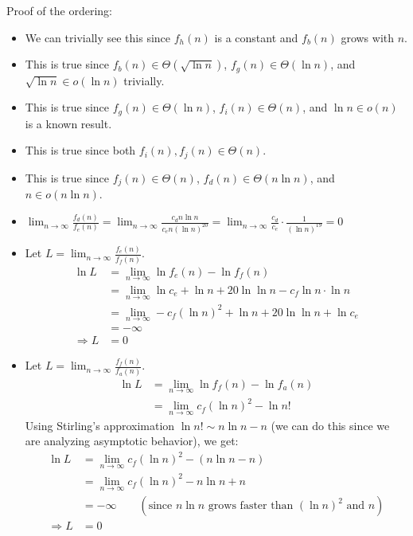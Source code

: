 \documentclass{article}
\begin{document}
  Proof of the ordering:
  \begin{itemize}
    \item[$f_h < f_b$] We can trivially see this since $f_h(n)$ is a constant and $f_b(n)$ grows with $n$.
    
    \item[$f_b < f_g$] This is true since $f_b(n) \in \Theta(\sqrt{\ln n})$, $f_g(n) \in \Theta(\ln n)$, and $\sqrt{\ln n} \in o(\ln n)$ trivially.
    
    \item[$f_g < f_i$] This is true since $f_g(n) \in \Theta(\ln n)$, $f_i(n) \in \Theta(n)$, and $\ln n \in o(n)$ is a known result.

    \item[$f_i \sim f_j$] This is true since both $f_i(n), f_j(n) \in \Theta(n)$.
    
    \item[$f_j < f_d$] This is true since $f_j(n) \in \Theta(n)$, $f_d(n) \in \Theta(n \ln n)$, and $n \in o(n \ln n)$.
    
    \item[$f_d < f_e$] $\lim_{n \to \infty} \frac{f_d(n)}{f_e(n)} = \lim_{n \to \infty} \frac{c_d n \ln n}{c_e n (\ln n)^{20}} = \lim_{n \to \infty} \frac{c_d}{c_e} \cdot \frac{1}{(\ln n)^{19}} = 0$
    
    \item[$f_e < f_f$] Let $L = \lim_{n \to \infty} \frac{f_e(n)}{f_f(n)}$.
    \begin{align*}
      \ln L &= \lim_{n \to \infty} \ln f_e(n) - \ln f_f(n) \\
      &= \lim_{n \to \infty} \ln c_e + \ln n + 20 \ln\ln n - c_f \ln n \cdot \ln n \\
      &= \lim_{n \to \infty} - c_f (\ln n)^2 + \ln n + 20 \ln\ln n + \ln c_e \\
      &= -\infty \\
      \Rightarrow L &= 0
    \end{align*}

    \item[$f_f < f_a$] Let $L = \lim_{n \to \infty} \frac{f_f(n)}{f_a(n)}$.
    \begin{align*}
      \ln L &= \lim_{n \to \infty} \ln f_f(n) - \ln f_a(n) \\
      &= \lim_{n \to \infty} c_f (\ln n)^2 - \ln n!
    \end{align*}
    Using Stirling's approximation $\ln n! \sim n \ln n - n$ (we can do this since we are analyzing asymptotic behavior), we get:
    \begin{align*}
      \ln L &= \lim_{n \to \infty} c_f (\ln n)^2 - (n \ln n - n) \\
      &= \lim_{n \to \infty} c_f (\ln n)^2 - n \ln n + n \\
      &= -\infty \qquad (\text{since } n \ln n \text{ grows faster than } (\ln n)^2 \text{ and } n) \\
      \Rightarrow L &= 0
    \end{align*}


\end{itemize}
\end{document}
